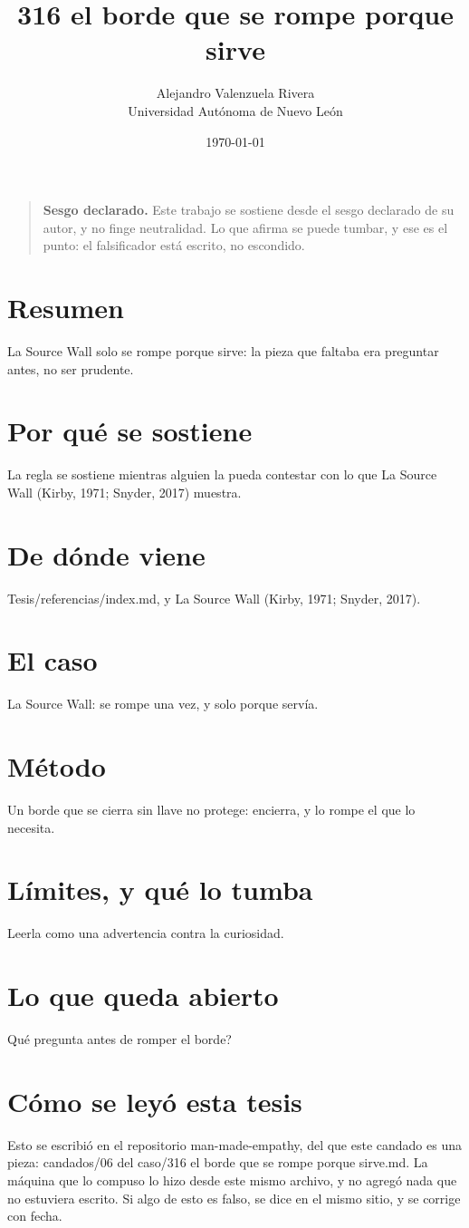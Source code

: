 \documentclass[11pt,a4paper]{article}
\title{316 el borde que se rompe porque sirve}
\author{Alejandro Valenzuela Rivera\\\small Universidad Autónoma de Nuevo León}
\date{\today}
\begin{document}
\maketitle

\begin{quote}
\textbf{Sesgo declarado.} Este trabajo se sostiene desde el sesgo declarado de su autor, y no finge neutralidad. Lo que afirma se puede tumbar, y ese es el punto: el falsificador está escrito, no escondido.
\end{quote}

\section*{Resumen}
La Source Wall solo se rompe porque sirve: la pieza que faltaba era preguntar antes, no ser prudente.

\section{Por qué se sostiene}
La regla se sostiene mientras alguien la pueda contestar con lo que La Source Wall (Kirby, 1971; Snyder, 2017) muestra.

\section{De dónde viene}
Tesis/referencias/index.md, y La Source Wall (Kirby, 1971; Snyder, 2017).

\section{El caso}
La Source Wall: se rompe una vez, y solo porque servía.

\section{Método}
Un borde que se cierra sin llave no protege: encierra, y lo rompe el que lo necesita.

\section{Límites, y qué lo tumba}
Leerla como una advertencia contra la curiosidad.

\section{Lo que queda abierto}
\textquestiondown{}Qué pregunta antes de romper el borde?

\section*{Cómo se leyó esta tesis}
Esto se escribió en el repositorio man-made-empathy, del que este candado es una pieza: candados/06 del caso/316 el borde que se rompe porque sirve.md. La máquina que lo compuso lo hizo desde este mismo archivo, y no agregó nada que no estuviera escrito. Si algo de esto es falso, se dice en el mismo sitio, y se corrige con fecha.
\end{document}
